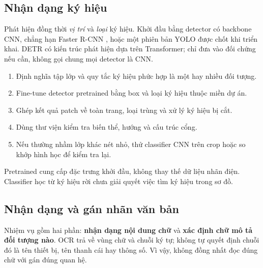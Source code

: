 \documentclass[11pt,a4paper]{article}
\begin{document}
\subsection{Nhận dạng ký hiệu}
Phát hiện đồng thời \emph{vị trí} và \emph{loại} ký hiệu. Khởi đầu bằng detector có backbone CNN, chẳng hạn Faster R-CNN \cite{fasterrcnn}, hoặc một phiên bản YOLO được chốt khi triển khai. DETR có kiến trúc phát hiện dựa trên Transformer; chỉ đưa vào đối chứng nếu cần, không gọi chung mọi detector là CNN.
\begin{enumerate}
  \item Định nghĩa tập lớp và quy tắc ký hiệu phức hợp là một hay nhiều đối tượng.
  \item Fine-tune detector pretrained bằng box và loại ký hiệu thuộc miền dự án.
  \item Ghép kết quả patch về toàn trang, loại trùng và xử lý ký hiệu bị cắt.
  \item Dùng thư viện kiểm tra biến thể, hướng và cấu trúc cổng.
  \item Nếu thường nhầm lớp khác nét nhỏ, thử classifier CNN trên crop hoặc so khớp hình học để kiểm tra lại.
\end{enumerate}
Pretrained cung cấp đặc trưng khởi đầu, không thay thế dữ liệu nhãn điện. Classifier học từ ký hiệu rời chưa giải quyết việc tìm ký hiệu trong sơ đồ.

\subsection{Nhận dạng và gán nhãn văn bản}
Nhiệm vụ gồm hai phần: \textbf{nhận dạng nội dung chữ} và \textbf{xác định chữ mô tả đối tượng nào}. OCR trả về vùng chữ và chuỗi ký tự; không tự quyết định chuỗi đó là tên thiết bị, tên thanh cái hay thông số. Vì vậy, không đồng nhất đọc đúng chữ với gán đúng quan hệ.
\end{document}
